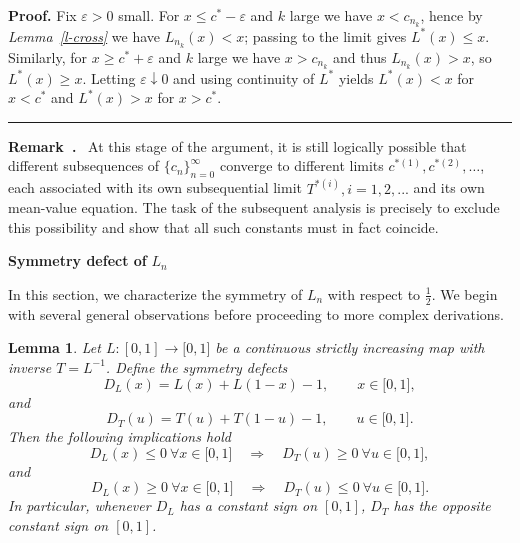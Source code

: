 \documentclass[onecolumn]{article}
\newtheorem{lemma}[theorem]{Lemma}
\newenvironment{remark}{  \refstepcounter{theorem}  \par\medskip\noindent\textbf{Remark~\thetheorem.}\rmfamily\ }{\par\medskip}
\newenvironment{proof}[1][Proof]{\noindent\textbf{#1.} }{\ \rule{0.5em}{0.5em}}
\begin{document}
\begin{proof}
Fix $\varepsilon >0$ small. For $x\leq c^{\ast }-\varepsilon $ and $k$ large
we have $x<c_{n_{k}}$, hence by \textit{Lemma~\ref{l-cross}} we have $%
L_{n_{k}}(x)<x$; passing to the limit gives $L^{\ast }(x)\leq x$. Similarly,
for $x\geq c^{\ast }+\varepsilon $ and $k$ large we have $x>c_{n_{k}}$ and
thus $L_{n_{k}}(x)>x$, so $L^{\ast }(x)\geq x$. Letting $\varepsilon
\downarrow 0$ and using continuity of $L^{\ast }$ yields $L^{\ast }(x)<x$
for $x<c^{\ast }$ and $L^{\ast }(x)>x$ for $x>c^{\ast }$.
\end{proof}

\begin{remark}
At this stage of the argument, it is still logically possible that different
subsequences of $\{c_{n}\}_{n=0}^{\infty }$ converge to different limits $%
c^{\ast (1)},c^{\ast (2)},\dots $, each associated with its own
subsequential limit $T^{\ast (i)},i=1,2,...$ and its own mean-value
equation. The task of the subsequent analysis is precisely to exclude this
possibility and show that all such constants must in fact coincide.
\end{remark}

\begin{flushleft}
\textbf{Symmetry defect of }$L_{n}$
\end{flushleft}

In this section, we characterize the symmetry of $L_{n}$ with respect to $%
\frac{1}{2}$. We begin with several general observations before proceeding
to more complex derivations.

\begin{lemma}
\label{defect-inverse-sign} Let $L:[0,1]\rightarrow \lbrack 0,1]$ be a
continuous strictly increasing map with inverse $T=L^{-1}$. Define the
symmetry defects 
\begin{equation}
D_{L}(x)=L(x)+L(1-x)-1,\qquad x\in \lbrack 0,1],  \label{1200}
\end{equation}%
and 
\begin{equation}
D_{T}(u)=T(u)+T(1-u)-1,\qquad u\in \lbrack 0,1].  \label{1201}
\end{equation}%
Then the following implications hold 
\begin{equation}
D_{L}(x)\leq 0\ \forall x\in \lbrack 0,1]\quad \Longrightarrow \quad
D_{T}(u)\geq 0\ \forall u\in \lbrack 0,1],  \label{1202}
\end{equation}%
and 
\begin{equation}
D_{L}(x)\geq 0\ \forall x\in \lbrack 0,1]\quad \Longrightarrow \quad
D_{T}(u)\leq 0\ \forall u\in \lbrack 0,1].  \label{1203}
\end{equation}%
In particular, whenever $D_{L}$ has a constant sign on $[0,1]$, $D_{T}$ has
the opposite constant sign on $[0,1]$.
\end{lemma}
\end{document}
